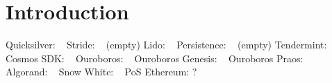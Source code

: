 \section{Introduction}

Quicksilver: ~\cite{quicksilver}
Stride: ~\cite{stride} (empty)
Lido: ~\cite{lido}
Persistence: ~\cite{persistence} (empty)
Tendermint: ~\cite{2018tendermint, buchman2016tendermint}
Cosmos SDK: ~\cite{cosmossdk}
Ouroboros: ~\cite{C:KRDO17}
Ouroboros Genesis: ~\cite{ouroboros-genesis}
Ouroboros Praos: ~\cite{EPRINT:DGKR17}
Algorand: ~\cite{EPRINT:GHMVZ17}
Snow White: ~\cite{EPRINT:BenPasShi16b}
PoS Ethereum: ?